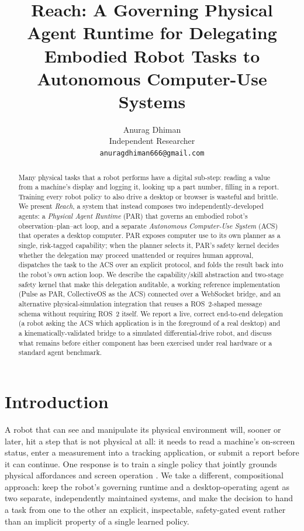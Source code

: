 \documentclass{article}
\title{Reach: A Governing Physical Agent Runtime for Delegating \\
Embodied Robot Tasks to Autonomous Computer-Use Systems}
\author{
  Anurag Dhiman \\
  Independent Researcher \\
  \texttt{anuragdhiman666@gmail.com}
}
\begin{document}
\maketitle

\begin{abstract}
Many physical tasks that a robot performs have a digital sub-step: reading a
value from a machine's display and logging it, looking up a part number,
filling in a report. Training every robot policy to also drive a desktop or
browser is wasteful and brittle. We present \textit{Reach}, a system that
instead composes two independently-developed agents: a \textit{Physical
Agent Runtime} (PAR) that governs an embodied robot's
observation--plan--act loop, and a separate \textit{Autonomous Computer-Use
System} (ACS) that operates a desktop computer. PAR exposes computer use to
its own planner as a single, risk-tagged capability; when the planner
selects it, PAR's safety kernel decides whether the delegation may proceed
unattended or requires human approval, dispatches the task to the ACS over
an explicit protocol, and folds the result back into the robot's own
action loop. We describe the capability/skill abstraction and two-stage
safety kernel that make this delegation auditable, a working reference
implementation (Pulse as PAR, CollectiveOS as the ACS) connected over a
WebSocket bridge, and an alternative physical-simulation integration that
reuses a ROS~2-shaped message schema without requiring ROS~2 itself. We
report a live, correct end-to-end delegation (a robot asking the ACS which
application is in the foreground of a real desktop) and a
kinematically-validated bridge to a simulated differential-drive robot,
and discuss what remains before either component has been exercised under
real hardware or a standard agent benchmark.
\end{abstract}

\section{Introduction}

A robot that can see and manipulate its physical environment will, sooner
or later, hit a step that is not physical at all: it needs to read a
machine's on-screen status, enter a measurement into a tracking
application, or submit a report before it can continue. One response is to
train a single policy that jointly grounds physical affordances and screen
operation \citep{driess2023palme,brohan2023rt2}. We take a different,
compositional approach: keep the robot's governing runtime and a
desktop-operating agent as two separate, independently maintained systems,
and make the decision to hand a task from one to the other an explicit,
inspectable, safety-gated event rather than an implicit property of a
single learned policy.
\end{document}

